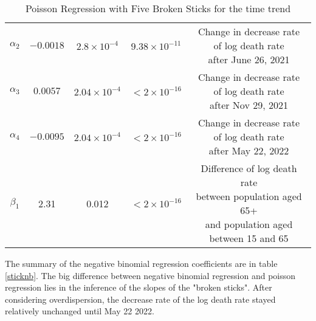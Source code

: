 \documentclass[12pt]{article}
\begin{document}
\begin{enumerate}[(a)]
\begin{table}[htbp]
\begin{tabular}{ccccc}
			\addlinespace[0.2cm]
			$\alpha_{2}$ & $-0.0018$ & $2.8\times 10^{-4}$ & $9.38\times 10^{-11}$& \makecell{Change in decrease rate \\ of log death rate\\ after June 26, 2021}\\
			\addlinespace[0.2cm]
			$\alpha_{3}$ & $0.0057$ & $2.04\times 10^{-4}$ & $<2\times 10^{-16}$& \makecell{Change in decrease rate \\ of log death rate\\ after Nov 29, 2021}\\
			\addlinespace[0.2cm]
			$\alpha_{4}$ & $-0.0095$ & $2.04\times 10^{-4}$ & $<2\times 10^{-16}$& \makecell{Change in decrease rate \\ of log death rate\\ after May 22, 2022}\\
			\addlinespace[0.2cm]
			$\beta_{1}$ & 2.31 & 0.012 & $<2\times 10^{-16}$ & \makecell{Difference of log death rate \\between population aged 65+ \\ and population aged between 15 and 65}\\
			\bottomrule
		\end{tabular}
		\caption{Poisson Regression with Five Broken Sticks for the time trend}\label{stickpoisson}
	\end{table}	
	
	
	The summary of the negative binomial regression coefficients are in table \ref{sticknb}. The big difference between negative binomial regression and poisson regression lies in the inference of the slopes of the "broken sticks". After considering overdispersion, the decrease rate of the log death rate stayed relatively unchanged until May 22 2022.
	

\end{enumerate}
\end{document}
